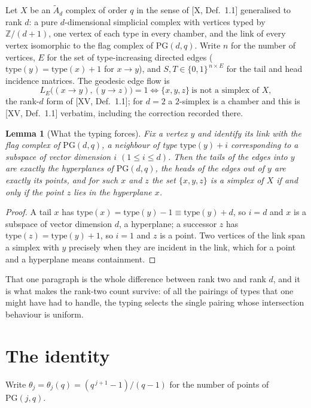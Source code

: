 \documentclass[11pt]{amsart}
\numberwithin{equation}{section}
\newtheorem{lemma}[theorem]{Lemma}
\theoremstyle{definition}
\theoremstyle{remark}
\newcommand{\Z}{\mathbb{Z}}
\newcommand{\Atilde}[1]{\widetilde A_{#1}}
\newcommand{\LE}{L_{E}}
\newcommand{\PG}{\mathrm{PG}}
\begin{document}
Let $X$ be an $\Atilde d$ complex of order $q$ in the sense of [X, Def.~1.1] generalised to
rank $d$: a pure $d$-dimensional simplicial complex with vertices typed by $\Z/(d+1)$,
one vertex of each type in every chamber, and the link of every vertex isomorphic to the
flag complex of $\PG(d,q)$. Write $n$ for the number of vertices, $E$ for the set of
type-increasing directed edges ($\mathrm{type}(y)=\mathrm{type}(x)+1$ for $x\to y$), and
$S,T\in\{0,1\}^{\,n\times E}$ for the tail and head incidence matrices. The geodesic edge
flow is
\[
\LE\bigl((x\to y),(y\to z)\bigr)=1\iff\{x,y,z\}\ \text{is not a simplex of }X,
\]
the rank-$d$ form of [XV, Def.~1.1]; for $d=2$ a $2$-simplex is a chamber and this is
[XV, Def.~1.1] verbatim, including the correction recorded there.

\begin{lemma}[What the typing forces]\label{lem:typing}
Fix a vertex $y$ and identify its link with the flag complex of $\PG(d,q)$, a neighbour of
type $\mathrm{type}(y)+i$ corresponding to a subspace of vector dimension $i$
$(1\le i\le d)$. Then the tails of the edges into $y$ are exactly the \emph{hyperplanes}
of $\PG(d,q)$, the heads of the edges out of $y$ are exactly its \emph{points}, and for
such $x$ and $z$ the set $\{x,y,z\}$ is a simplex of $X$ if and only if the point $z$ lies
in the hyperplane $x$.
\end{lemma}

\begin{proof}
A tail $x$ has $\mathrm{type}(x)=\mathrm{type}(y)-1\equiv\mathrm{type}(y)+d$, so $i=d$ and
$x$ is a subspace of vector dimension $d$, a hyperplane; a successor $z$ has
$\mathrm{type}(z)=\mathrm{type}(y)+1$, so $i=1$ and $z$ is a point. Two vertices of the
link span a simplex with $y$ precisely when they are incident in the link, which for a
point and a hyperplane means containment.
\end{proof}

That one paragraph is the whole difference between rank two and rank $d$, and it is what
makes the rank-two count survive: of all the pairings of types that one might have had to
handle, the typing selects the single pairing whose intersection behaviour is uniform.

\section{The identity}\label{sec:identity}

Write $\theta_j=\theta_j(q)=(q^{\,j+1}-1)/(q-1)$ for the number of points of $\PG(j,q)$.
\end{document}
